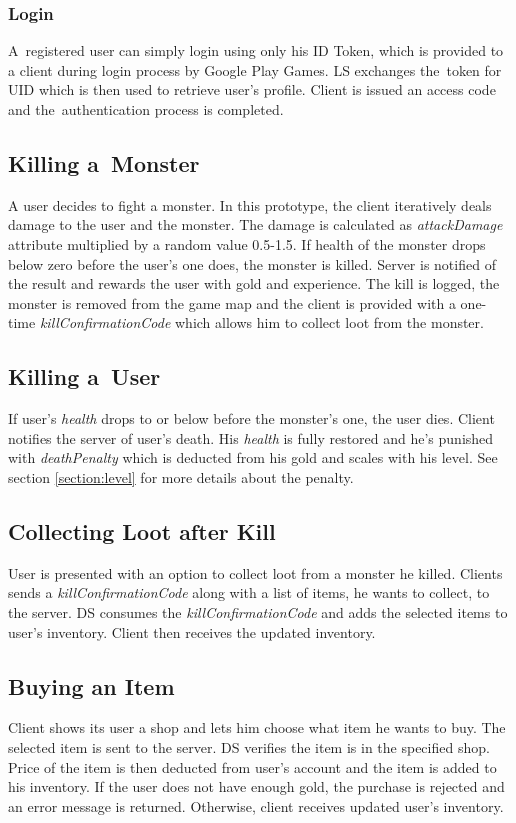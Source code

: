 		\subsubsection*{Login}
		A~registered user can simply login using only his ID Token, which is provided to a client during login process by Google Play Games. LS exchanges the~token for UID which is then used to retrieve user's profile. Client is issued an access code and the~authentication process is completed.
	
	\subsection{Killing a~Monster}
	A user decides to fight a monster. In this prototype, the client iteratively deals damage to the user and the monster. The damage is calculated as \textit{attackDamage} attribute multiplied by a random value 0.5-1.5. If health of the monster drops below zero before the user's one does, the monster is killed. Server is notified of the result and rewards the user with gold and experience. The kill is logged, the monster is removed from the game map and the client is provided with a one-time \textit{killConfirmationCode} which allows him to collect loot from the monster.
		
	\subsection{Killing a~User}
	If user's \textit{health} drops to or below before the monster's one, the user dies. Client notifies the server of user's death. His \textit{health} is fully restored and he's punished with \textit{deathPenalty} which is deducted from his gold and scales with his level. See section \ref{section:level} for more details about the penalty.
	
	\subsection{Collecting Loot after Kill}
	User is presented with an option to collect loot from a monster he killed. Clients sends a \textit{killConfirmationCode} along with a list of items, he wants to collect, to the server. DS consumes the \textit{killConfirmationCode} and adds the selected items to user's inventory. Client then receives the updated inventory.
	
	\subsection{Buying an Item}
	Client shows its user a shop and lets him choose what item he wants to buy. The selected item is sent to the server. DS verifies the item is in the specified shop. Price of the item is then deducted from user's account and the item is added to his inventory. If the user does not have enough gold, the purchase is rejected and an error message is returned. Otherwise, client receives updated user's inventory.
	
